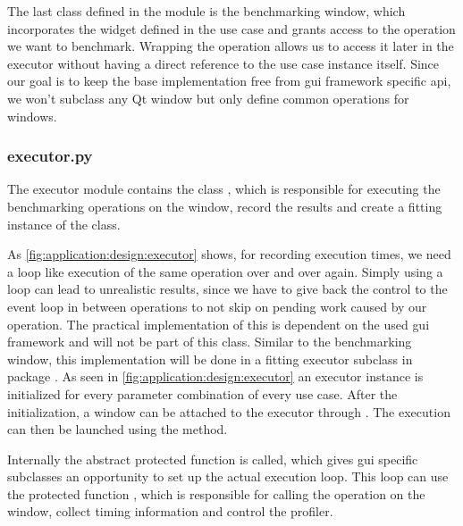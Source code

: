 

The last class defined in the module is the benchmarking window, which
incorporates the widget defined in the use case and grants access to the
operation we want to benchmark. Wrapping the operation allows us to access it
later in the executor without having a direct reference to the use case
instance itself. Since our goal is to keep the base implementation free from
\gls{gui} framework specific \gls{api}, we won't subclass any Qt window but
only define common operations for windows.

\subsubsection*{executor.py}

The executor module contains the class
, which is responsible for executing
the benchmarking operations on the window, record the results and create a
fitting instance of the  class.

As \ref{fig:application:design:executor} shows, for recording execution times,
we need a loop like execution of the same operation over and over again. Simply
using a loop can lead to unrealistic results, since we have to give back the
control to the event loop in between operations to not skip on pending work
caused by our operation. The practical implementation of this is dependent on
the used \gls{gui} framework and will not be part of this class. Similar to the
benchmarking window, this implementation will be done in a fitting executor
subclass in package . As seen in
\ref{fig:application:design:executor} an executor instance is initialized for
every parameter combination of every use case. After the initialization, a
window can be attached to the executor through
. The execution can then be launched using the
 method. 



Internally the abstract protected function  is
called, which gives \gls{gui} specific subclasses an opportunity to set up the
actual execution loop. This loop can use the protected function
, which is responsible for calling the
operation on the window, collect timing information and control the profiler.


